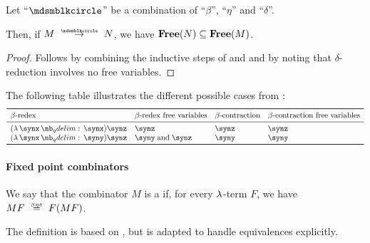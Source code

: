 \begin{proposition}\label{thm:lambda_reduction_free_variables}
  Let \enquote{\( {\Anon} \)} be a combination of \enquote{\( \beta \)}, \enquote{\( \eta \)} and \enquote{\( \delta \)}.

  Then, if \( M \pred N \), we have \( \op*{Free}(N) \subseteq \op*{Free}(M) \).
\end{proposition}
\begin{proof}
  Follows by combining the inductive steps of  and  and by noting that \( \delta \)-reduction involves no free variables.
\end{proof}

\begin{example}\label{ex:thm:lambda_reduction_free_variables}
  The following table illustrates the different possible cases from :
  \begin{equation*}
    \begin{array}{*{4}{l}}
      \toprule
      \T{\( \beta \)-redex}     & \T{\( \beta \)-redex free variables} & \T{\( \beta \)-contraction} & \T{\( \beta \)-contraction free variables} \\
      \midrule
      (\qabs \synx \synx) \synz & \synz                                & \synz                       & \synz                                      \\
      (\qabs \synx \syny) \synz & \syny \T{and} \synz                  & \syny                       & \syny                                      \\
      \bottomrule
    \end{array}
  \end{equation*}
\end{example}

\paragraph{Fixed point combinators}

\begin{definition}\label{def:fixed_point_combinator}\mimprovised
  We say that the combinator \( M \) is a  if, for every \( \mathrm{\lambda} \)-term \( F \), we have \( MF \equivrel{\beta\eta\delta} F(MF) \).
\end{definition}
\begin{comments}
  \item The definition is based on \cite[\S 6.1.2]{Barendregt1984LambdaCalculus}, but is adapted to handle equivalences explicitly.
\end{comments}

